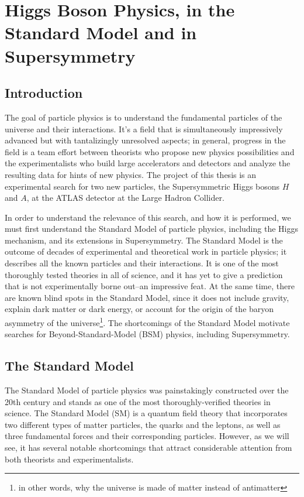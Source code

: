  

\chapter[Theory of Higgs Physics]{Higgs Boson Physics, in the Standard Model and in Supersymmetry}
\label{chapter:Theory}



\section{Introduction}
The goal of particle physics is to understand the fundamental particles of the universe and 
their interactions. It's a field that is simultaneously impressively advanced but 
with tantalizingly unresolved aspects; in general, progress in the field is a team 
effort between theorists who propose new physics possibilities and the experimentalists who build 
large accelerators and detectors and analyze the resulting data for hints of new physics.  The project of this thesis is 
an experimental search for two new particles, the Supersymmetric Higgs bosons $H$ 
and $A$, at the ATLAS detector at the Large Hadron Collider.

In order to understand the relevance of this search, and how it is performed, 
we must first understand the Standard Model of particle physics, including the Higgs mechanism, 
and its extensions in Supersymmetry.  The Standard Model is the outcome of decades of 
experimental and theoretical work in particle physics; it describes all the known particles and 
their interactions.  It is one of the most thoroughly tested theories in all of 
science, and it has yet to give a prediction that is not experimentally borne 
out--an impressive feat.  At the same time, there are known blind 
spots in the Standard Model, since it does not include gravity, explain dark 
matter or dark energy, or account for the origin of the baryon asymmetry of the universe\footnote{
in other words, why the universe is made of matter instead of antimatter}.   The shortcomings of the 
Standard Model motivate searches for Beyond-Standard-Model (BSM) physics, including Supersymmetry.  


\section{The Standard Model}
The Standard Model of particle physics was painstakingly constructed over the 20th century and stands 
as one of the most thoroughly-verified theories in science.  The Standard Model 
(SM) is a quantum field theory that incorporates two different types of matter 
particles, the quarks and the leptons, as well as three fundamental forces and 
their corresponding particles.  However, as we will see, it has several notable 
shortcomings that attract considerable attention from both theorists and experimentalists.  

